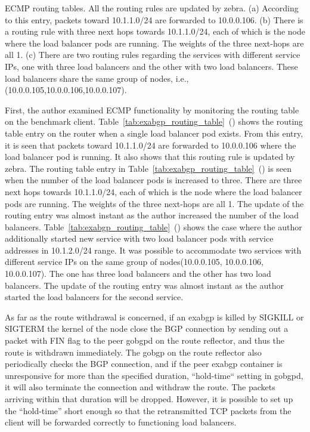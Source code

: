 \begin{table}[h]
  \par\bigskip
  \centering
  \begin{minipage}{0.9\columnwidth}
    \caption[ECMP routing tables]{
ECMP routing tables. All the routing rules are updated by zebra.
(a) According to this entry, packets toward 10.1.1.0/24 are forwarded to 10.0.0.106.
(b) There is a routing rule with three next hops towards 10.1.1.0/24, each of which is the node where the load balancer pods are running.
The weights of the three next-hops are all 1.
(c) There are two routing rules regarding the services with different service IPs, one with three load balancers and the other with two load balancers.
These load balancers share the same group of nodes, i.e., (10.0.0.105,10.0.0.106,10.0.0.107).
    }
    \label{tab:exabgp_routing_table}
  \end{minipage}
\end{table}

First, the author examined ECMP functionality by monitoring the routing table on the benchmark client.
Table~\ref{tab:exabgp_routing_table}~() shows the routing table entry on the router when a single load balancer pod exists.
From this entry, it is seen that packets toward 10.1.1.0/24 are forwarded to 10.0.0.106 where the load balancer pod is running.
It also shows that this routing rule is updated by zebra.
%
The routing table entry in Table~\ref{tab:exabgp_routing_table}~() is seen when the number of the load balancer pods is increased to three.
There are three next hops towards 10.1.1.0/24, each of which is the node where the load balancer pods are running.
The weights of the three next-hops are all 1.
The update of the routing entry was almost instant as the author increased the number of the load balancers.
%
Table~\ref{tab:exabgp_routing_table}~() shows the case where the author additionally started new service with two load balancer pods with service addresses in 10.1.2.0/24 range.
It was possible to accommodate two services with different service IPs on the same group of nodes(10.0.0.105, 10.0.0.106, 10.0.0.107). 
The one has three load balancers and the other has two load balancers.
The update of the routing entry was almost instant as the author started the load balancers for the second service.

As far as the route withdrawal is concerned, if an exabgp is killed by SIGKILL or SIGTERM the kernel of the node close the BGP connection by sending out a packet with FIN flag to the peer gobgpd on the route reflector, and thus the route is withdrawn immediately.
The gobgp on the route reflector also periodically checks the BGP connection, and if the peer exabgp container is unresponsive for more than the specified duration, “hold-time“ setting in gobgpd, it will also terminate the connection and withdraw the route.
The packets arriving within that duration will be dropped.
However, it is possible to set up the “hold-time” short enough so that the retransmitted TCP packets from the client will be forwarded correctly to functioning load balancers.

